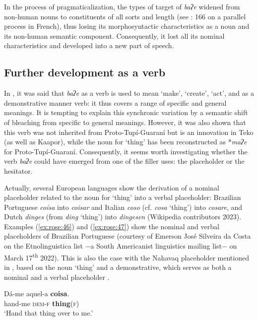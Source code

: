 \documentclass[output=paper]{langscibook}
\begin{document}
In the process of pragmaticalization, the types of target of \textit{baʔe} widened from non-human nouns to constituents of all sorts and length (see \citealt{Mihatsch2006}: 166 on a parallel process in French), thus losing its morphosyntactic characteristics as a noun and its non-human semantic component. Consequently, it lost all its nominal characteristics and developed into a new part of speech.

\subsection{Further development as a verb} 
\label{sec:rose:5.3}
In , it was said that \textit{baʔe} as a verb is used to mean ‘make’, ‘create’, ‘act’, and as a demonstrative manner verb: it thus covers a range of specific and general meanings. It is tempting to explain this synchronic variation by a semantic shift of bleaching from specific to general meanings. However, it was also shown that this verb was not inherited from Proto-Tupí-Guaraní but is an innovation in Teko (as well as Kaapor), while the noun for ‘thing’ has been reconstructed as *\textit{maʔe} for Proto-Tupí-Guaraní. Consequently, it seems worth investigating whether the verb \textit{baʔe} could have emerged from one of the filler uses: the placeholder or the hesitator.

Actually, several European languages show the derivation of a nominal placeholder related to the noun for ‘thing’ into a verbal placeholder: Brazilian Portuguese \textit{coisa} into \textit{coisar} and Italian \textit{coso} (cf. \textit{cosa} ‘thing’) into \textit{cosare}, and Dutch \textit{dinges} (from \textit{ding} ‘thing’) into \textit{dingesen} (Wikipedia contributors 2023). Examples (\ref{ex:rose:46}) and (\ref{ex:rose:47}) show the nominal and verbal placeholders of Brazilian Portuguese (courtesy of Emerson José Silveira da Costa on the Etnolinguistica list $-$a South Americanist linguistics mailing list$-$ on March 17\textsuperscript{th} 2022). This is also the case with the Nahavaq placeholder mentioned in , based on the noun ‘thing’ and a demonstrative, which serves as both a nominal and a verbal placeholder \citep[207--209]{Dimock2010}.

\ea \label{ex:rose:46}
\gll Dá-me  aquel-a  \textbf{coisa}. \\
hand-me  \textsc{dem-f}  \textbf{thing}(\textsc{f})\\
\glt ‘Hand that thing over to me.’
\z 
\end{document}
